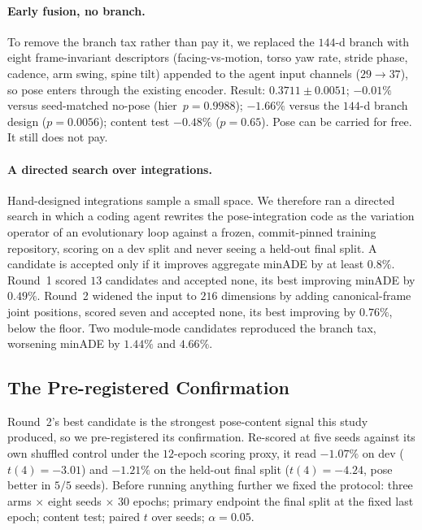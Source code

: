 \documentclass{article} %
\newcommand{\minADE}{minADE\xspace}
\begin{document}
\paragraph{Early fusion, no branch.}
To remove the branch tax rather than pay it, we replaced the $144$-d branch with
eight frame-invariant descriptors (facing-vs-motion, torso yaw rate, stride phase,
cadence, arm swing, spine tilt) appended to the agent input channels
($29 \to 37$), so pose enters through the existing encoder. Result:
$0.3711 \pm 0.0051$; $-0.01\%$ versus seed-matched no-pose (hier~$p{=}0.9988$);
$-1.66\%$ versus the $144$-d branch design ($p{=}0.0056$); content test $-0.48\%$
($p{=}0.65$). Pose can be carried for free. It still does not pay.

\paragraph{A directed search over integrations.}
Hand-designed integrations sample a small space. We therefore ran a directed
search in which a coding agent rewrites the pose-integration code as the variation
operator of an evolutionary loop against a frozen, commit-pinned training
repository, scoring on a dev split and never seeing a held-out final split. A
candidate is accepted only if it improves aggregate \minADE by at least $0.8\%$.
Round~1 scored $13$ candidates and accepted none, its best improving \minADE by
$0.49\%$. Round~2 widened the input to $216$ dimensions by adding canonical-frame
joint positions, scored seven and accepted none, its best improving by $0.76\%$,
below the floor. Two module-mode candidates reproduced the branch tax, worsening
\minADE by $1.44\%$ and $4.66\%$.

\subsection{The Pre-registered Confirmation}
\label{sec:confirmation}

Round~2's best candidate is the strongest pose-content signal this study produced,
so we pre-registered its confirmation. Re-scored at five seeds against its own
shuffled control under the $12$-epoch scoring proxy, it read $-1.07\%$ on dev
($t(4){=}-3.01$) and $-1.21\%$ on the held-out final split ($t(4){=}-4.24$, pose
better in $5/5$ seeds). Before running anything further we fixed the protocol:
three arms $\times$ eight seeds $\times$ $30$ epochs; primary endpoint the final
split at the fixed last epoch; content test; paired $t$ over seeds; $\alpha{=}0.05$.
\end{document}
